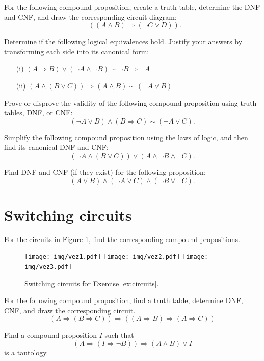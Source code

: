 \documentclass[11pt,paper=b5,footinclude,headinclude]{scrbook} %
\theoremstyle{remark}
\theoremstyle{definition} %
\theoremstyle{theorem} %
\newtheorem{ex}{Exercise\hypertarget{sol:\theex}}[chapter]
\begin{document}
\begin{ex}
For the following compound proposition, create a truth table, determine the DNF and CNF, and draw the corresponding circuit diagram:
\[
\neg((A \land B) \Rightarrow (\neg C \lor D)).
\]
\end{ex}

\begin{ex}
Determine if the following logical equivalences hold. Justify your answers by transforming each side into its canonical form:
\begin{itemize}
    \item[(i)] \((A \Rightarrow B) \lor (\neg A \land \neg B) \sim \neg B \Rightarrow \neg A\)
    \item[(ii)] \((A \land (B \lor C)) \Rightarrow (A \land B) \sim (\neg A \lor B)\)
\end{itemize}
\end{ex}

\begin{ex}
Prove or disprove the validity of the following compound proposition using truth tables, DNF, or CNF:
\[
(\neg A \lor B) \land (B \Rightarrow C) \sim (\neg A \lor C).
\]
\end{ex}

\begin{ex}
Simplify the following compound proposition using the laws of logic, and then find its canonical DNF and CNF:
\[
(\neg A \land (B \lor C)) \lor (A \land \neg B \land \neg C).
\]
\end{ex}

\begin{ex}
Find DNF and CNF (if they exist) for the following proposition:
\[
(A \lor B) \land (\neg A \lor C) \land (\neg B \lor \neg C).
\]
\end{ex}

\section{Switching circuits}

     \begin{ex} For the circuits in Figure \ref{fig:circuits}, find the corresponding compound propositions.\label{ex:circuits}


\begin{figure}
    \centering
    \texttt{[image: img/vez1.pdf]}
    \texttt{[image: img/vez2.pdf]}
    \texttt{[image: img/vez3.pdf]}
    \caption{Switching circuits for Exercise \ref{ex:circuits}.}
    \label{fig:circuits}
\end{figure}



    \end{ex} \begin{ex} For the following compound proposition, find a truth table, determine DNF, CNF, and draw the corresponding circuit.
\[
(A \Rightarrow (B \Rightarrow C)) \Rightarrow ((A \Rightarrow B) \Rightarrow (A \Rightarrow C))
\]
    \end{ex} \begin{ex} Find a compound proposition $I$ such that
\[
(A \Rightarrow (I \Rightarrow \neg B)) \Rightarrow (A \land B) \lor I
\]
is a tautology.
\end{ex}
\end{document}
